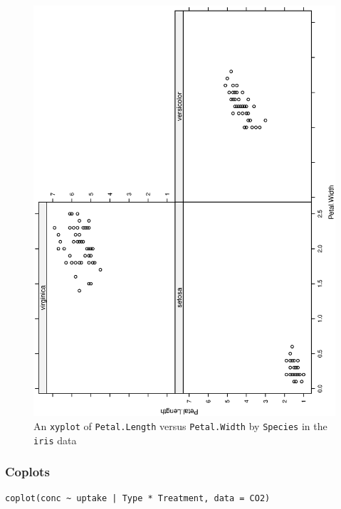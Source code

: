 \documentclass[captions=tableheading]{scrbook}
\begin{document}
\begin{figure}[th]
  \includegraphics[angle=270, totalheight=4in]{ps/datadesc/xyplot.ps}
  \caption[An \texttt{xyplot} of \texttt{Petal.Length} versus \texttt{Petal.Width} by \texttt{Species}]{An \texttt{xyplot} of \texttt{Petal.Length} versus \texttt{Petal.Width} by \texttt{Species} in the \texttt{iris} data}
  \label{fig-xyplot}
\end{figure}
\subsubsection{Coplots}
\label{sec-3-6-3-4}



\lstset{language=R}
\begin{lstlisting}
coplot(conc ~ uptake | Type * Treatment, data = CO2)
\end{lstlisting}
\end{document}
